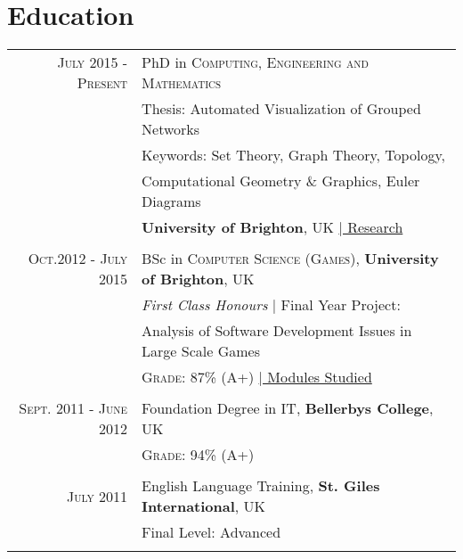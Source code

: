 \documentclass[a4paper,10pt]{article} %
\begin{document}
\section{Education}

\begin{tabular}{r|p{11cm}}
\textsc{July 2015 - Present} & PhD in \textsc{Computing, Engineering and Mathematics}\\
& Thesis: Automated Visualization of Grouped Networks\\
& Keywords: Set Theory, Graph Theory, Topology,\\
& Computational Geometry \& Graphics, Euler Diagrams \\
& \textbf{University of Brighton}, UK \hyperlink{papers}{\hfill | \footnotesize Research}\\
\multicolumn{2}{c}{} \\

	
\textsc{Oct.2012 - July 2015} & BSc in \textsc{Computer Science (Games)}, \textbf{University of Brighton}, UK\\
& \small\emph{First Class Honours} | Final Year Project: \\
& Analysis of Software Development Issues in Large Scale Games\\
&\normalsize \textsc{Grade}: 87\% (A+) \hyperlink{grds}{\hfill | \footnotesize Modules Studied}\\
\multicolumn{2}{c}{} \\


\textsc{Sept. 2011 - June 2012} & Foundation Degree in \textsc{IT}, \normalsize\textbf{Bellerbys College}, UK\\
&\normalsize \textsc{Grade}: 94\% (A+) \\
\multicolumn{2}{c}{} \\


\textsc{July 2011} & English Language Training, \textbf{St. Giles International}, UK \\
& Final Level: Advanced\\
\multicolumn{2}{c}{} \\

\end{tabular}
\vspace{1cm}

\end{document}
